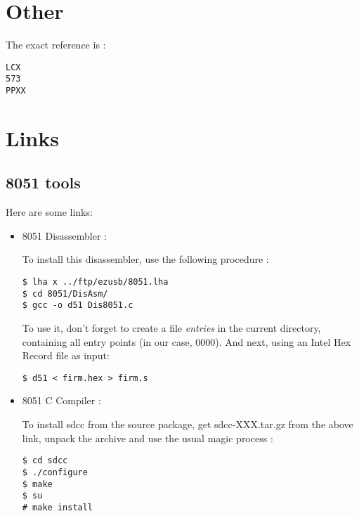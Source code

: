 \documentclass[a4paper,12pt]{article}
\begin{document}
\section{Other}

The exact reference is :
\begin{verbatim}
LCX
573
PPXX
\end{verbatim}

\section{Links}

\subsection{8051 tools}

Here are some links:
\begin{itemize}
\item 8051 Disassembler :

To install this disassembler, use the following procedure :
\begin{verbatim}
$ lha x ../ftp/ezusb/8051.lha
$ cd 8051/DisAsm/
$ gcc -o d51 Dis8051.c
\end{verbatim}

To use it, don't forget to create a file \textit{entries} in the
current directory, containing all entry points (in our case,
0000). And next, using an Intel Hex Record file as input:
\begin{verbatim}
$ d51 < firm.hex > firm.s
\end{verbatim}

\item 8051 C Compiler :

To install sdcc from the source package, get sdcc-XXX.tar.gz from the
above link, unpack the archive and use the usual magic process :
\begin{verbatim}
$ cd sdcc
$ ./configure
$ make
$ su
# make install
\end{verbatim}

\end{itemize}
\end{document}

